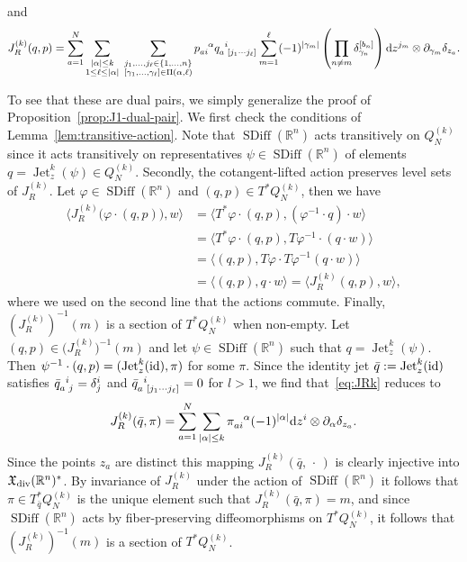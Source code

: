 \documentclass[12pt]{amsart}
\newcommand{\R}{\ensuremath{\mathbb{R}}}
\newcommand{\dz}{\ensuremath{\textrm{d}z}}
\DeclareMathOperator{\SDiff}{SDiff}
\DeclareMathOperator{\Jet}{Jet}
\begin{document}
  and
  \begin{equation}\label{eq:JRk}
    J_R^{(k)}(q,p) = \sum_{a=1}^{N}
    \sum_{\substack{ |\alpha| \leq k \\ 1 \leq \ell \leq |\alpha| }} \;
		\sum_{
			\substack{
				j_1,\dots,j_\ell \in \{1,\dots,n\} \\
				[\gamma_1,\dots,\gamma_\ell] \in \Pi(\alpha,\ell)
				}
			}
			p\indices{_a_i^\alpha} q\indices{_a^i_{[j_1 \cdots j_\ell]}}
      \sum_{m=1}^\ell (-1)^{|\gamma_m|}\left( \prod_{n \neq m}  \delta_{\gamma_n}^{[b_n]} \right) \dz^{j_m} \otimes \partial_{\gamma_m}\delta_{z_a}.
  \end{equation}

  To see that these are dual pairs, we simply generalize the proof of
  Proposition~\ref{prop:J1-dual-pair}. We first check the conditions
  of Lemma~\ref{lem:transitive-action}. Note that $\SDiff(\R^n)$ acts
  transitively on $Q^{(k)}_N$ since it acts transitively on
  representatives $\psi \in \SDiff(\R^n)$ of elements
  $q = \Jet^k_z(\psi) \in Q^{(k)}_N$. Secondly, the cotangent-lifted
  action preserves level sets of $J_R^{(k)}$. Let
  $\varphi \in \SDiff(\R^n)$ and $(q,p) \in T^* Q^{(k)}_N$, then we
  have
  \begin{align*}
    \langle J_R^{(k)}\big(\varphi\cdot(q,p)\big), w \rangle
    &= \langle T^{*} \varphi \cdot (q,p) , ( \varphi^{-1} \cdot q ) \cdot w \rangle \\
    &= \langle T^{*} \varphi \cdot (q,p) ,  T\varphi^{-1} \cdot (q \cdot w) \rangle \\
    &= \langle (q,p) , T \varphi \cdot T\varphi^{-1} (q \cdot w) \rangle \\
    &= \langle (q,p) , q \cdot w \rangle = \langle J_{R}^{(k)}(q,p) , w \rangle,
  \end{align*}
  where we used on the second line that the actions commute.
  Finally, $(J_R^{(k)})^{-1}(m)$ is a section of $T^* Q^{(k)}_N$ when
  non-empty. Let $(q,p) \in \big(J_R^{(k)}\big)^{-1}(m)$ and let
  $\psi \in \SDiff(\R^n)$ such that $q = \Jet^{k}_z(\psi)$. Then
  $\psi^{-1} \cdot (q,p) = (\Jet^k_z(\rm{id}),\pi)$ for some $\pi$.
  Since the identity jet $\bar{q} := \Jet^k_z(\rm{id})$ satisfies
  $\bar{q}\indices{_a^i_j} = \delta^i_j$ and
  $\bar{q}\indices{_a^i_{[j_1 \cdots j_\ell]}} = 0$ for $l > 1$, we
  find that~\eqref{eq:JRk} reduces to
  \begin{equation*}
    J_R^{(k)}(\bar{q},\pi) = \sum_{a=1}^N
    \sum_{|\alpha| \leq k}
			\pi\indices{_a_i^\alpha} (-1)^{|\alpha|} \dz^i \otimes \partial_\alpha \delta_{z_a}.
  \end{equation*}
  Since the points $z_a$ are distinct this mapping
  $J_R^{(k)}(\bar{q},\,\cdot\,)$ is clearly injective into
  $\mathfrak{X}_{\rm div}(\R^n)^*$. By invariance of $J_R^{(k)}$ under
  the action of $\SDiff(\R^n)$ it follows that
  $\pi \in T^*_{\bar{q}} Q^{(k)}_N$ is the unique element such that
  $J_R^{(k)}(\bar{q},\pi) = m$, and since $\SDiff(\R^n)$ acts by
  fiber-preserving diffeomorphisms on $T^* Q^{(k)}_N$, it follows that
  $(J_R^{(k)})^{-1}(m)$ is a section of $T^* Q^{(k)}_N$.
\end{document}
